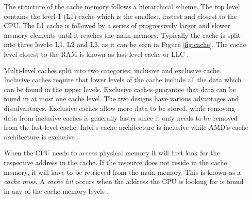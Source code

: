 \documentclass[10pt,a4paper,twoside]{book}
\begin{document}
The structure of the cache memory follows a hierarchical scheme. The top level contains the level 1 (L1) cache which is the smallest, fastest and closest to the CPU. The L1 cache is followed by a series of progressively larger and slower memory elements until it reaches the main memory. Typically the cache is split into three levels: L1, L2 and L3, as it can be seen in Figure \ref{fig:cache}. The cache level closest to the RAM is known as last-level cache or LLC \cite{oren2015spy}.

Multi-level caches split into two categories: inclusive and exclusive cache. Inclusive caches require that lower levels of the cache include all the data which can be found in the upper levels. Exclusive caches guarantee that data can be found in at most one cache level. The two designs have various advantages and disadvantages. Exclusive caches allow more data to be stored, while removing data from inclusive caches is generally faster since it only needs to be removed from the last-level cache. Intel's cache architecture is inclusive while AMD's cache architecture is exclusive \cite{oren2015spy}.

When the CPU needs to access physical memory it will first look for the respective address in the cache. If the resource does not reside in the cache memory, it will have to be retrieved from the main memory. This is known as a \textit{cache miss}. A \textit{cache hit} occurs when the address the CPU is looking for is found in any of the cache memory levels \cite{oren2015spy}.
\end{document}

